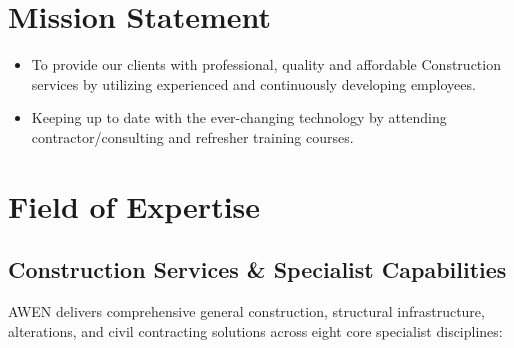 \documentclass[a4paper,11pt]{article}
\providecommand{\faCheckSquare}{\faCheck}
\begin{document}
\section{Mission Statement}

\begin{tcolorbox}[
  enhanced, colback=white, colframe=awenMidGrey, 
  boxrule=0.8pt, arc=4pt, top=10pt, bottom=10pt, left=12pt, right=12pt
]
\begin{itemize}[label=\textcolor{awenGold}{\faCheckSquare}, itemsep=6pt, font=\color{awenDarkGrey}]
  \item To provide our clients with professional, quality and affordable Construction services by utilizing experienced and continuously developing employees.
  \item Keeping up to date with the ever-changing technology by attending contractor/consulting and refresher training courses.
\end{itemize}
\end{tcolorbox}

\newpage

\section{Field of Expertise}

\subsection{Construction Services \& Specialist Capabilities}

\color{awenDarkGrey}
AWEN delivers comprehensive general construction, structural infrastructure, alterations, and civil contracting solutions across eight core specialist disciplines:

\vspace{0.35cm}

\newcommand{\ServiceCardHeader}[3]{%
  \begin{tabularx}{\linewidth}{@{} >{\centering\arraybackslash}m{0.85cm} @{\hspace{6.5pt}} >{\raggedright\arraybackslash}m{\dimexpr\linewidth-0.85cm-6.5pt\relax} @{}}
    \begin{tikzpicture}[baseline=(iconnode.center)]
      \node (iconnode) [fill=awenLightGrey, draw=awenMaroon, rounded corners=3.5pt, line width=0.7pt, inner sep=3.8pt] {
        {\color{awenMaroon}\fontsize{10.5pt}{10.5pt}\selectfont #1}
      };
    \end{tikzpicture}
    &
    {\fontsize{9pt}{11pt}\selectfont\bfseries\color{awenDarkMaroon} #2}\par\vspace{1.5pt}%
    {\fontsize{7.2pt}{8.5pt}\selectfont\color{awenTextMuted} #3}
  \end{tabularx}%
}
\end{document}
